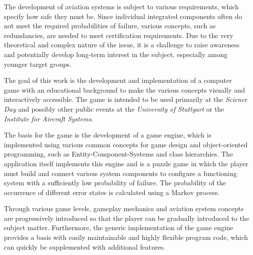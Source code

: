 
{\LARGE \thetitle}

The development of aviation systems is subject to various requirements, which specify how safe they must be.
Since individual integrated components often do not meet the required probabilities of failure, various concepts,
such as redundancies, are needed to meet certification requirements.
Due to the very theoretical and complex nature of the issue, it is a challenge to raise awareness and potentially develop
long-term interest in the subject, especially among younger target groups.

The goal of this work is the development and implementation of a computer game with an educational background to make the
various concepts visually and interactively accessible.
The game is intended to be used primarily at the \textit{Science Day} and possibly other public events at the
\textit{University of Stuttgart} or the \textit{Institute for Aircraft Systems}.

The basis for the game is the development of a game engine, which is implemented using various common concepts for
game design and object-oriented programming, such as Entity-Component-Systems and class hierarchies.
The application itself implements this engine and is a puzzle game in which the player must build and connect
various system components to configure a functioning system with a sufficiently low probability of failure.
The probability of the occurrence of different error states is calculated using a Markov process.

Through various game levels, gameplay mechanics and aviation system concepts are progressively introduced so that the
player can be gradually introduced to the subject matter.
Furthermore, the generic implementation of the game engine provides a basis with easily maintainable and highly flexible
program code, which can quickly be supplemented with additional features.
